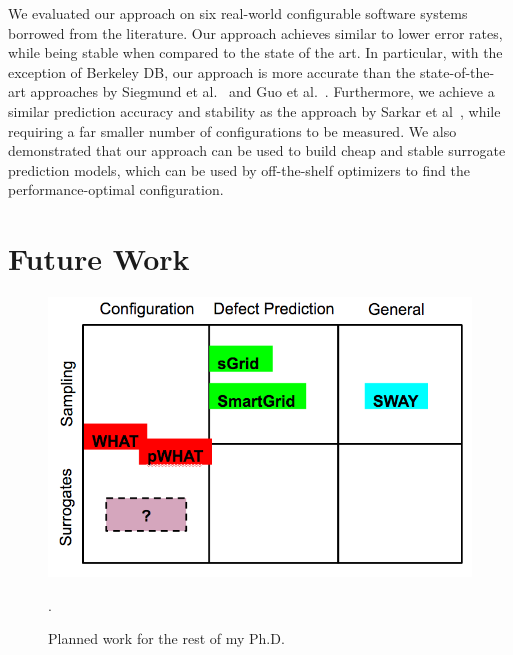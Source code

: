 \documentclass{newsig}
\begin{document}
We evaluated our approach on six real-world configurable software systems borrowed from the literature. Our approach achieves similar to lower error rates, while being stable when compared to the state of the art. In particular, with the exception of Berkeley DB, our approach is more accurate than the state-of-the-art approaches by Siegmund et al.~\cite{siegmund2012predicting} and Guo et al.~\cite{guo2013variability}. Furthermore, we achieve a similar prediction accuracy and stability as the approach by Sarkar et al~\cite{sarkar2015cost}, while requiring a far smaller number of configurations to be measured. We also demonstrated that our approach can be used to build cheap and stable surrogate prediction models, which can be used by off-the-shelf optimizers to find the performance-optimal configuration. 


\section{Future Work}

\begin{figure}[tbh]
\centering
\includegraphics[width=0.9\columnwidth]{Figures/FutureWork}
\caption{Planned work for the rest of my Ph.D.}.
\label{fig:futurework}
\end{figure}
\end{document}
